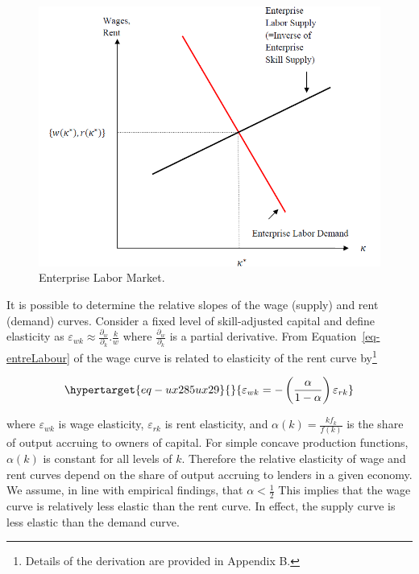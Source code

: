 \documentclass[
  a4paper,
  DIV=11,
  numbers=noendperiod]{scrartcl}
\begin{document}
\begin{figure}

{\centering \includegraphics{figures/figure-10.png}

}

\caption{\label{fig-figure-10}Enterprise Labor Market.}

\end{figure}

It is possible to determine the relative slopes of the wage (supply) and
rent (demand) curves. Consider a fixed level of skill-adjusted capital
and define elasticity as
\(\varepsilon_{wk} \approx \frac{\partial_w}{\partial_k}.\frac{k}{w}\)
where \(\frac{\partial_w}{\partial_k}\) is a partial derivative. From
Equation~\ref{eq-entreLabour} of the wage curve is related to elasticity
of the rent curve by\footnote{Details of the derivation are provided in
  Appendix B.}

\begin{equation}\protect\hypertarget{eq-ux285ux29}{}{
\varepsilon_{wk} = -\left(\frac{\alpha}{1-\alpha}\right)\varepsilon_{rk}
}\label{eq-(5)}\end{equation}

where \(\varepsilon_{wk}\) is wage elasticity, \(\varepsilon_{rk}\) is
rent elasticity, and \(\alpha(k) = \frac{kf_k}{f(k)}\) is the share of
output accruing to owners of capital. For simple concave production
functions, \(\alpha(k)\) is constant for all levels of \(k\). Therefore
the relative elasticity of wage and rent curves depend on the share of
output accruing to lenders in a given economy. We assume, in line with
empirical findings, that \(\alpha<\frac{1}{2}\) This implies that the
wage curve is relatively less elastic than the rent curve. In effect,
the supply curve is less elastic than the demand curve.
\end{document}
